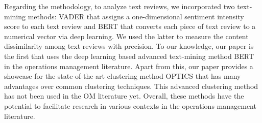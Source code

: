 \documentclass[msom,blindrev]{informs3}
\begin{document}
Regarding the methodology, to analyze text reviews, we incorporated two text-mining methods: VADER that assigns a one-dimensional sentiment intensity score to each text review  and BERT that converts each piece of text review to a numerical vector via deep learning. We used the latter to measure the content dissimilarity among text reviews with precision. To our knowledge, our paper is the first that uses the deep learning based advanced text-mining method BERT in the operations management literature.  Apart from this, our paper provides a showcase for the state-of-the-art clustering method OPTICS that has many advantages over common clustering techniques. This advanced clustering method has not been used in the OM literature yet. Overall, these methods have the potential to facilitate research in various contexts in the operations management literature.



\newpage
\end{document}
